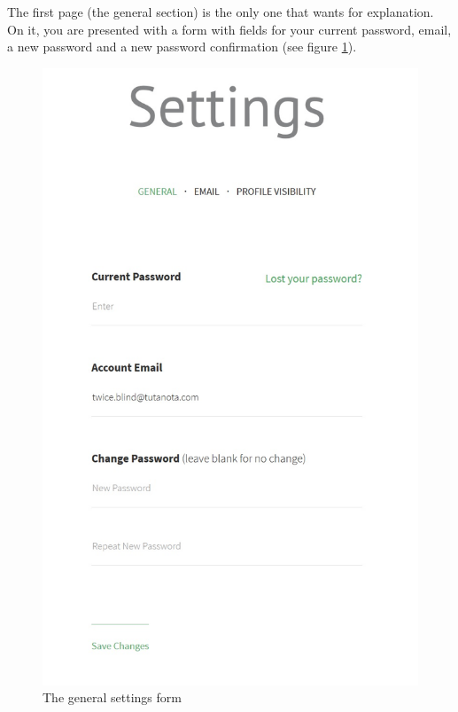 \documentclass[10pt]{article}
\begin{document}
\begin{flushleft}
The first page (the general section) is the only one that wants for explanation.  On it, you are presented with a form with fields for your current password, email, a new password and a new password confirmation (see figure \ref{settings}).

\end{flushleft}

\begin{figure}[H]
    \centering
    \includegraphics[scale=0.3]{images/settings.jpg}
    \caption{The general settings form}
    \label{settings}
\end{figure}
\end{document}
